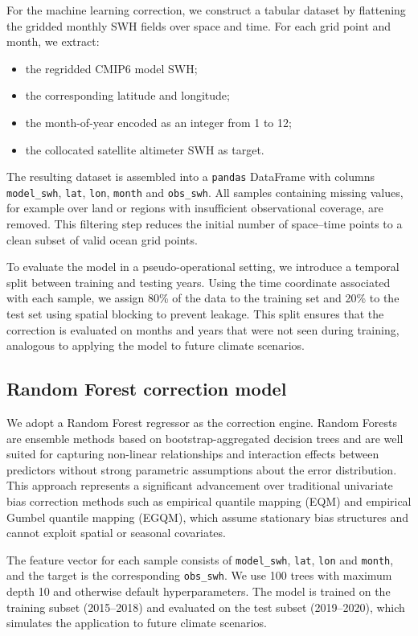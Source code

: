 \documentclass[twocolumn]{article}
\begin{document}
 For the machine learning correction, we construct a tabular dataset by flattening the gridded monthly SWH fields over space and time. For each grid point and month, we extract:
 \begin{itemize}
   \item the regridded CMIP6 model SWH;
   \item the corresponding latitude and longitude;
   \item the month-of-year encoded as an integer from 1 to 12;
   \item the collocated satellite altimeter SWH as target.
 \end{itemize}
 
 The resulting dataset is assembled into a \texttt{pandas} DataFrame with columns \texttt{model\_swh}, \texttt{lat}, \texttt{lon}, \texttt{month} and \texttt{obs\_swh}. All samples containing missing values, for example over land or regions with insufficient observational coverage, are removed. This filtering step reduces the initial number of space--time points to a clean subset of valid ocean grid points.
 
 To evaluate the model in a pseudo-operational setting, we introduce a temporal split between training and testing years. Using the time coordinate associated with each sample, we assign 80\% of the data to the training set and 20\% to the test set using spatial blocking to prevent leakage. This split ensures that the correction is evaluated on months and years that were not seen during training, analogous to applying the model to future climate scenarios.
 
 \subsection{Random Forest correction model}
 
 We adopt a Random Forest regressor as the correction engine. Random Forests are ensemble methods based on bootstrap-aggregated decision trees and are well suited for capturing non-linear relationships and interaction effects between predictors without strong parametric assumptions about the error distribution. This approach represents a significant advancement over traditional univariate bias correction methods such as empirical quantile mapping (EQM) and empirical Gumbel quantile mapping (EGQM), which assume stationary bias structures and cannot exploit spatial or seasonal covariates.
 
 The feature vector for each sample consists of \texttt{model\_swh}, \texttt{lat}, \texttt{lon} and \texttt{month}, and the target is the corresponding \texttt{obs\_swh}. We use 100 trees with maximum depth 10 and otherwise default hyperparameters. The model is trained on the training subset (2015--2018) and evaluated on the test subset (2019--2020), which simulates the application to future climate scenarios.
 
\end{document}
